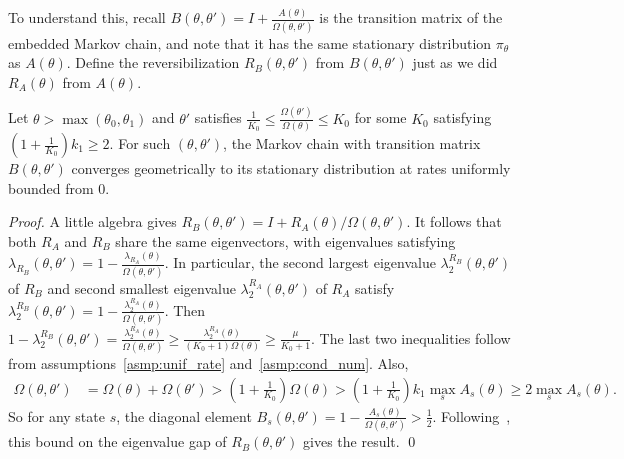 To understand this, recall $B(\theta, \theta') = I+\frac{A(\theta)}{\Omega(\theta, \theta')}$
is the transition matrix of the embedded Markov chain, and note that 
it has the same stationary distribution $\pi_\theta$ as $A(\theta)$.
Define the reversibilization $R_B(\theta,\theta')$ from $B(\theta,\theta')$ 
just as we did $R_A(\theta)$ from $A(\theta)$. 
\begin{lemma}
  Let $\theta > \max (\theta_0, \theta_1)$ and $\theta'$ satisfies 
$\frac{1}{K_0} \le \frac{\Omega(\theta')}{\Omega(\theta)} \le K_0 $ for 
some $K_0$ %
satisfying $(1 + \frac{1}{K_0})k_1 \ge 2$. 
For such $(\theta,\theta')$, the Markov chain with transition matrix $B(\theta,\theta')$ converges geometrically to its stationary 
distribution at rates uniformly bounded from $0$.

  \label{lem:eig_lemma}
\end{lemma}
\begin{proof}
A little algebra gives $R_B(\theta,\theta') = I + R_A(\theta)/\Omega(\theta,\theta')$. It 
follows that both $R_A$ and $R_B$ share the same eigenvectors, with 
eigenvalues satisfying 
$\lambda_{R_B}(\theta, \theta') = 1 - \frac{\lambda_{R_A}(\theta)}{\Omega(\theta,
\theta')}$. In particular, the second largest eigenvalue 
$\lambda_2^{R_B}(\theta,\theta')$ of $R_B$ and  
second smallest eigenvalue $\lambda^{R_A}_2(\theta,\theta')$ of $R_A$ satisfy  
$\lambda^{R_B}_2(\theta,\theta') = 1 - \frac{\lambda^{R_A}_2(\theta)}{\Omega(\theta, \theta')}$.
Then $1 - \lambda^{R_B}_2(\theta,\theta') = \frac{\lambda^{R_A}_2(\theta)}{\Omega(\theta, \theta')} 
\ge \frac{\lambda^{R_A}_2(\theta)}{(K_0+1)\Omega(\theta)} 
\ge \frac{\mu}{K_0+1} $. The last two inequalities follow from 
assumptions~\ref{asmp:unif_rate} and~\ref{asmp:cond_num}. 
Also, 
\begin{align*}
\Omega(\theta, \theta') &= \Omega(\theta) + \Omega(\theta') > (1 + \frac{1}{K_0})\Omega(\theta)
 > (1 + \frac{1}{K_0})k_1\max_s A_{s}(\theta) \ge 2\max_s A_{s}(\theta). %
\end{align*}
So for any state $s$, the diagonal element $B_s(\theta, \theta') = 1 - 
\frac{A_s(\theta)}{\Omega(\theta, \theta')}> \frac{1}{2}$.
Following~\cite{fill1991}, this bound on the eigenvalue gap of $R_B(\theta,\theta')$ gives the result.
\qed
\end{proof}

